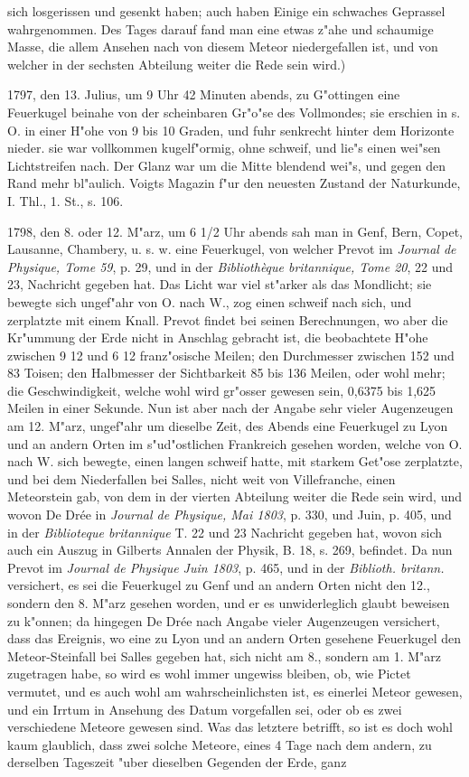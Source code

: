 \documentclass[a4paper, 11pt, oneside, polutonikogreek, german]{article}
\begin{document}
sich losgerissen und gesenkt haben; auch haben Einige ein schwaches Geprassel wahrgenommen. Des Tages darauf fand man eine etwas z"ahe und schaumige Masse, die allem Ansehen nach von diesem Meteor niedergefallen ist, und von welcher in der sechsten Abteilung weiter die Rede sein wird.)

1797, den 13. Julius, um 9 Uhr 42 Minuten abends, zu G"ottingen eine Feuerkugel beinahe von der scheinbaren Gr"o"se des Vollmondes; sie erschien in s. O. in einer H"ohe von 9 bis 10 Graden, und fuhr senkrecht hinter dem Horizonte nieder. sie war vollkommen kugelf"ormig, ohne schweif, und lie"s einen wei"sen Lichtstreifen nach. Der Glanz war um die Mitte blendend wei"s, und gegen den Rand mehr bl"aulich. Voigts Magazin f"ur den neuesten Zustand der Naturkunde, I. Thl., 1. St., s. 106.

1798, den 8. oder 12. M"arz, um 6 1/2 Uhr abends sah man in Genf, Bern, Copet, Lausanne, Chambery, u. s. w. eine Feuerkugel, von welcher Prevot im \emph{Journal de Physique, Tome 59}, p. 29, und in der \emph{Bibliothèque britannique, Tome 20}, 22 und 23, Nachricht gegeben hat. Das Licht war viel st"arker als das Mondlicht; sie bewegte sich ungef"ahr von O. nach W., zog einen schweif nach sich, und zerplatzte mit einem Knall. Prevot findet bei seinen Berechnungen, wo aber die Kr"ummung der Erde nicht in Anschlag gebracht ist, die beobachtete H"ohe zwischen 9 12 und 6 12 franz"osische Meilen; den Durchmesser zwischen 152 und 83 Toisen; den Halbmesser der Sichtbarkeit 85 bis 136 Meilen, oder wohl mehr; die Geschwindigkeit, welche wohl wird gr"osser gewesen sein, 0,6375 bis 1,625 Meilen in einer Sekunde. Nun ist aber nach der Angabe sehr vieler Augenzeugen am 12. M"arz, ungef"ahr um dieselbe Zeit, des Abends eine Feuerkugel zu Lyon und an andern Orten im s"ud"ostlichen Frankreich gesehen worden, welche von O. nach W. sich bewegte, einen langen schweif hatte, mit starkem Get"ose zerplatzte, und bei dem Niederfallen bei Salles, nicht weit von Villefranche, einen Meteorstein gab, von dem in der vierten Abteilung weiter die Rede sein wird, und wovon De Drée in \emph{Journal de Physique, Mai 1803}, p. 330, und Juin, p. 405, und in der \emph{Biblioteque britannique} T. 22 und 23 Nachricht gegeben hat, wovon sich auch ein Auszug in Gilberts Annalen der Physik, B. 18, s. 269, befindet. Da nun Prevot im \emph{Journal de Physique Juin 1803}, p. 465, und in der \emph{Biblioth. britann.} versichert, es sei die Feuerkugel zu Genf und an andern Orten nicht den 12., sondern den 8. M"arz gesehen worden, und er es unwiderleglich glaubt beweisen zu k"onnen; da hingegen De Drée nach Angabe vieler Augenzeugen versichert, dass das Ereignis, wo eine zu Lyon und an andern Orten gesehene Feuerkugel den Meteor-Steinfall bei Salles gegeben hat, sich nicht am 8., sondern am 1. M"arz zugetragen habe, so wird es wohl immer ungewiss bleiben, ob, wie Pictet vermutet, und es auch wohl am wahrscheinlichsten ist, es einerlei Meteor gewesen, und ein Irrtum in Ansehung des Datum vorgefallen sei, oder ob es zwei verschiedene Meteore gewesen sind. Was das letztere betrifft, so ist es doch wohl kaum glaublich, dass zwei solche Meteore, eines 4 Tage nach dem andern, zu derselben Tageszeit "uber dieselben Gegenden der Erde, ganz 
\end{document}
